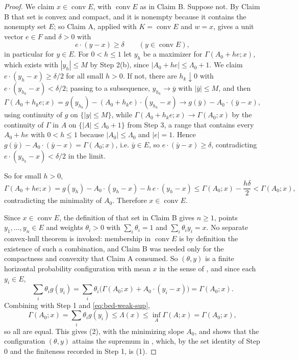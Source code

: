 \begin{proof}
We claim $x\in\operatorname{conv}E$, with $\operatorname{conv}E$ as in Claim B.
Suppose not. By Claim B that set is convex and compact, and it is nonempty
because it contains the nonempty set $E$; so Claim A, applied with
$K=\operatorname{conv}E$ and $w=x$, gives a unit vector $e\in F$ and $\delta>0$
with
\[
  e\cdot(y-x)\ge\delta\qquad(y\in\operatorname{conv}E),
\]
in particular for $y\in E$. For $0<h\le1$ let $y_h$ be a maximizer for
$\Gamma(A_0+he;x)$, which exists with $|y_h|\le M$ by Step 2(b), since
$|A_0+he|\le\Lambda_0+1$. We claim $e\cdot(y_h-x)\ge\delta/2$ for all small
$h>0$. If not, there are $h_k\downarrow0$ with $e\cdot(y_{h_k}-x)<\delta/2$;
passing to a subsequence, $y_{h_k}\to\bar y$ with $|\bar y|\le M$, and then
\[
  \Gamma(A_0+h_ke;x)=g(y_{h_k})-(A_0+h_ke)\cdot(y_{h_k}-x)
   \longrightarrow g(\bar y)-A_0\cdot(\bar y-x),
\]
using continuity of $g$ on $\{|y|\le M\}$, while
$\Gamma(A_0+h_ke;x)\to\Gamma(A_0;x)$ by the continuity of $\Gamma$ in $A$ on
$\{|A|\le\Lambda_0+1\}$ from Step 3, a range that contains every $A_0+he$ with
$0<h\le1$ because $|A_0|\le\Lambda_0$ and $|e|=1$. Hence $g(\bar y)-A_0\cdot(\bar y-x)=\Gamma(A_0;x)$, i.e. $\bar y\in E$,
so $e\cdot(\bar y-x)\ge\delta$, contradicting
$e\cdot(y_{h_k}-x)<\delta/2$ in the limit.

So for small $h>0$,
\[
  \Gamma(A_0+he;x)=g(y_h)-A_0\cdot(y_h-x)-h\,e\cdot(y_h-x)
   \le\Gamma(A_0;x)-\frac{h\delta}{2}<\Gamma(A_0;x),
\]
contradicting the minimality of $A_0$. Therefore $x\in\operatorname{conv}E$.

Since $x\in\operatorname{conv}E$, the definition of that set in Claim B gives
$n\ge1$, points $y_1,\dots,y_n\in E$ and weights $\theta_i>0$ with
$\sum_i\theta_i=1$ and $\sum_i\theta_iy_i=x$. No separate convex-hull theorem is
invoked: membership in $\operatorname{conv}E$ is by definition the existence of
such a combination, and Claim B was needed only for the compactness and
convexity that Claim A consumed. So $(\theta,y)$ is a finite horizontal
probability configuration with mean $x$ in the sense of ,
and since each $y_i\in E$,
\[
  \sum_i\theta_ig(y_i)
   =\sum_i\theta_i\bigl(\Gamma(A_0;x)+A_0\cdot(y_i-x)\bigr)
   =\Gamma(A_0;x).
\]
Combining with Step 1 and \eqref{eq:bed-weak-sup},
\[
  \Gamma(A_0;x)=\sum_i\theta_ig(y_i)\le\Lambda(x)\le\inf_A\Gamma(A;x)
   =\Gamma(A_0;x),
\]
so all are equal. This gives (2), with the minimizing slope $A_0$, and shows
that the configuration $(\theta,y)$ attains the supremum in
, which, by the set identity of Step 0 and the finiteness
recorded in Step 1, is (1).


\end{proof}
